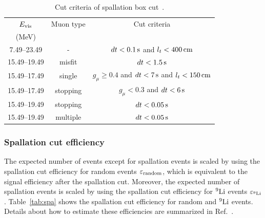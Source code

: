 \begin{table}[H]
	\centering
	\caption[Cut criteria of spallation box cut]{
	Cut criteria of spallation box cut~\cite{2023HaradaPhD}.
	}\label{tab:box}
	\vs
	\begin{tabular}{ccc} \hline \hline
		$E_{\rm vis}$ & Muon type & Cut criteria                                                         \\
		(MeV)         &           &                                                                      \\ \hline
		7.49--23.49   & -         & $dt < 0.1\,{\rm s}$ and $l_{t} < 400\,{\rm cm}$                      \\
		15.49--19.49  & misfit    & $dt < 1.5\,{\rm s}$                                                  \\
		15.49--17.49  & single    & $g_{\mu} \geq 0.4$ and $dt < 7\,{\rm s}$ and $l_{t} < 150\,{\rm cm}$ \\
		15.49--17.49  & stopping  & $g_{\mu} < 0.3$ and $dt < 6\,{\rm s}$                                \\
		15.49--19.49  & stopping  & $dt < 0.05\,{\rm s}$                                                 \\
		15.49--19.49  & multiple  & $dt < 0.05\,{\rm s}$                                                 \\ \hline \hline
	\end{tabular}
\end{table}

\subsubsection{Spallation cut efficiency}
\vs\hs
The expected number of events except for spallation events is scaled by using the spallation cut efficiency for random events $\varepsilon_{\rm random}$, which is equivalent to the signal efficiency after the spallation cut.
Moreover, the expected number of spallation events is scaled by using the spallation cut efficiency for $^{9}{\rm Li}$ events $\varepsilon_{\rm ^{9}Li}$.
Table~\ref{tab:spa} shows the spallation cut efficiency for random and $^{9}{\rm Li}$ events.
Details about how to estimate these efficiencies are summarized in Ref.~\cite{2023HaradaPhD}.

